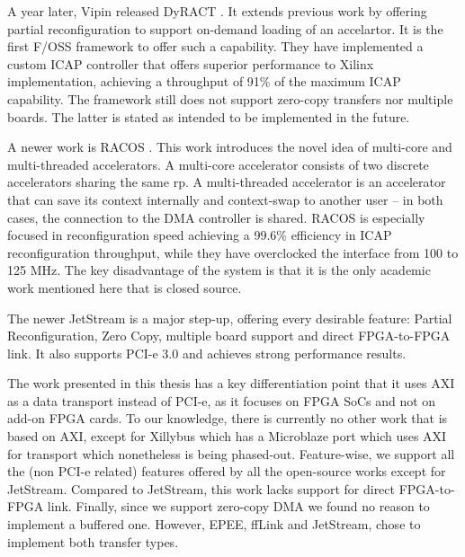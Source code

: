 A year later, Vipin released DyRACT \cite{dyract}.
It extends previous work by offering partial reconfiguration to support on-demand loading of an accelartor.
It is the first F/OSS framework to offer such a capability.
They have implemented a custom ICAP controller that offers superior performance to Xilinx implementation,
achieving a throughput of 91\% of the maximum ICAP capability.
The framework still does not support zero-copy transfers nor multiple boards. 
The latter is stated as intended to be implemented in the future.


A newer work is RACOS \cite{racos}. This work introduces the novel idea of multi-core and multi-threaded accelerators.
A multi-core accelerator consists of two discrete accelerators sharing the same \gls{rp}. A multi-threaded accelerator
is an accelerator that can save its context internally and context-swap to another user -- in both cases, the 
connection to the DMA controller is shared. RACOS is especially focused in reconfiguration speed achieving a 99.6\%
efficiency in ICAP reconfiguration throughput, while they have overclocked the interface from 100 to 125 MHz.
The key disadvantage of the system is that it is the only academic work mentioned here that is closed source.



The newer JetStream \cite{jetstream} is a major step-up, offering every desirable feature: Partial Reconfiguration, Zero Copy,
multiple board support and direct FPGA-to-FPGA link. It also supports PCI-e 3.0 and achieves strong performance results.


The work presented in this thesis has a key differentiation point that it uses AXI as a data transport instead of PCI-e,
as it focuses on FPGA SoCs and not on add-on FPGA cards. To our knowledge, there is currently no other work that is based
on AXI, except for Xillybus which has a Microblaze port which uses AXI for transport which nonetheless is being phased-out.
Feature-wise, we support all the (non PCI-e related) features offered by all the open-source works except for JetStream.
Compared to JetStream, this work lacks support for direct FPGA-to-FPGA link. 
Finally, since we support zero-copy DMA we found no reason to implement a buffered one. 
However, EPEE, ffLink and JetStream, chose to implement both transfer types.

